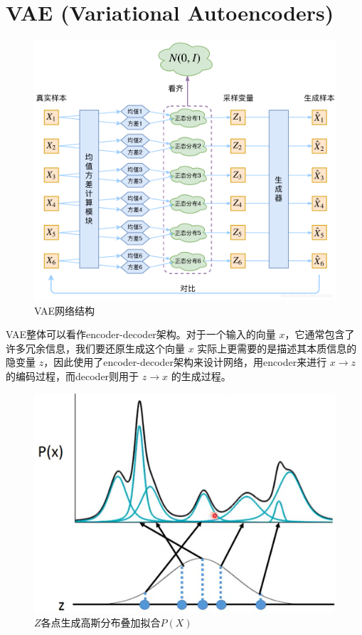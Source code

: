 \documentclass[12pt,a4paper,UTF8]{article}
\begin{document}
\section{VAE (Variational Autoencoders)}

\begin{figure}[htb]\centering\includegraphics[scale=0.36]{./figure/3.png}\caption{VAE网络结构}\label{vae_img}\end{figure}

\indent VAE整体可以看作encoder-decoder架构。对于一个输入的向量 $x$，它通常包含了许多冗余信息，我们要还原生成这个向量 $x$ 实际上更需要的是描述其本质信息的隐变量 $z$，因此使用了encoder-decoder架构来设计网络，用encoder来进行 $x\to z$ 的编码过程，而decoder则用于 $z\to x$ 的生成过程。\\

\begin{figure}[htb]\centering\includegraphics[scale=0.5]{./figure/4.png}\caption{$Z$各点生成高斯分布叠加拟合$P\left(X\right)$}\label{dmm_img}\end{figure}
\end{document}
